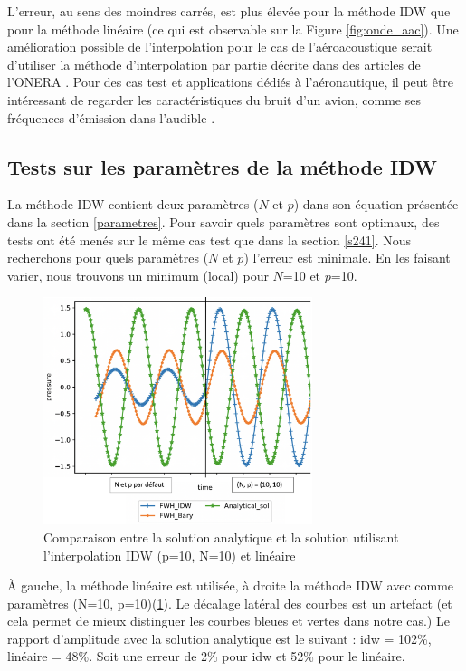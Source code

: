 L'erreur, au sens des moindres carrés, est plus élevée pour la méthode IDW que pour la méthode linéaire (ce qui est observable sur la Figure \ref{fig:onde_aac}).
Une amélioration possible de l'interpolation pour le cas de l'aéroacoustique serait d'utiliser la méthode d'interpolation par partie décrite dans des articles de l’ONERA \cite{cunha2011, cunha2016}.
Pour des cas test et applications dédiés à l'aéronautique, il peut être intéressant de regarder les caractéristiques du bruit d'un avion, comme ses fréquences d'émission dans l'audible \cite{frequence}.

\subsection{Tests sur les paramètres de la méthode IDW} \label{s244}

La méthode IDW contient deux paramètres (\(N\) et \(p\)) dans son équation présentée dans la section \ref{parametres}.
Pour savoir quels paramètres sont optimaux, des tests ont été menés sur le même cas test que dans la section \ref{s241}.
Nous recherchons pour quels paramètres (\(N\) et \(p\)) l'erreur est minimale.
En les faisant varier, nous trouvons un minimum (local) pour \(N\)=10 et \(p\)=10.

\begin{figure}[H]
    \centering
    \includegraphics[width=0.70\textwidth]{images/rapport_a_np.png}
    \caption{Comparaison entre la solution analytique et la solution utilisant l'interpolation IDW (p=10, N=10) et linéaire}
    \label{fig:np10}
\end{figure}

À gauche, la méthode linéaire est utilisée, à droite la méthode IDW avec comme paramètres (N=10, p=10)(\ref{fig:np10}). Le décalage latéral des courbes est un artefact (et cela permet de mieux distinguer les courbes bleues et vertes dans notre cas.)
Le rapport d'amplitude avec la solution analytique est le suivant : idw = 102\%, linéaire = 48\%. Soit une erreur de 2\% pour idw et 52\% pour le linéaire. %






